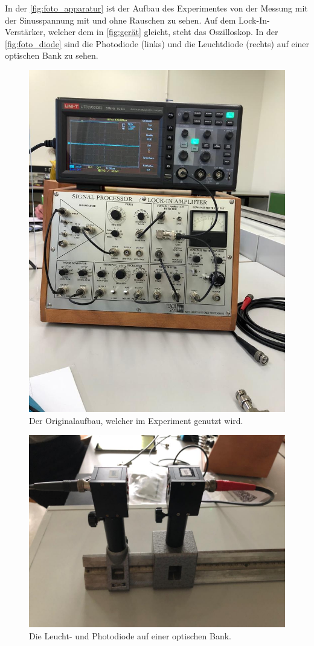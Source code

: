     \noindent In der \autoref{fig:foto_apparatur} ist der Aufbau des Experimentes von der Messung mit der Sinusspannung mit und ohne
    Rauschen zu sehen. Auf dem Lock-In-Verstärker, welcher dem in \autoref{fig:gerät} gleicht, steht das Oszilloskop.  
    In der \autoref{fig:foto_diode} sind die Photodiode (links) und die Leuchtdiode (rechts) auf einer optischen Bank 
    zu sehen.

    \begin{figure}
        \centering
        \includegraphics[width=\textwidth]{bilder/foto_apparatur.jpeg}
        \caption{Der Originalaufbau, welcher im Experiment genutzt wird.}
        \label{fig:foto_apparatur}
    \end{figure}

    \begin{figure}
        \centering
        \includegraphics[width=\textwidth]{bilder/foto_diode.jpeg}
        \caption{Die Leucht- und Photodiode auf einer optischen Bank.}
        \label{fig:foto_diode}
    \end{figure}